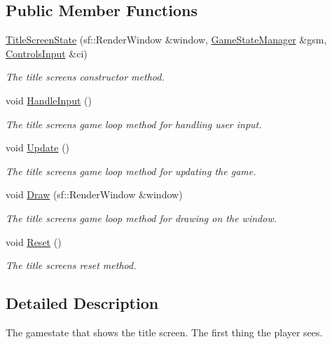 \subsection*{Public Member Functions}
\begin{DoxyCompactItemize}
\item 
\hyperlink{class_title_screen_state_ae0ab0c01ac47f036618a9d328d547ccd}{Title\+Screen\+State} (sf\+::\+Render\+Window \&window, \hyperlink{class_game_state_manager}{Game\+State\+Manager} \&gsm, \hyperlink{struct_controls_input}{Controls\+Input} \&ci)
\begin{DoxyCompactList}\small\item\em The title screen\textquotesingle{}s constructor method. \end{DoxyCompactList}\item 
void \hyperlink{class_title_screen_state_a1bad900daba7f6481632a58212f39af0}{Handle\+Input} ()
\begin{DoxyCompactList}\small\item\em The title screen\textquotesingle{}s game loop method for handling user input. \end{DoxyCompactList}\item 
void \hyperlink{class_title_screen_state_a0db8d35f9d3013155d2e61939d2a47ea}{Update} ()
\begin{DoxyCompactList}\small\item\em The title screen\textquotesingle{}s game loop method for updating the game. \end{DoxyCompactList}\item 
void \hyperlink{class_title_screen_state_a1e1022947dac4a9b69c6bde57fe52217}{Draw} (sf\+::\+Render\+Window \&window)
\begin{DoxyCompactList}\small\item\em The title screen\textquotesingle{}s game loop method for drawing on the window. \end{DoxyCompactList}\item 
void \hyperlink{class_title_screen_state_a7e6cf3ef5534f42a4ca1e75045a45c71}{Reset} ()
\begin{DoxyCompactList}\small\item\em The title screen\textquotesingle{}s reset method. \end{DoxyCompactList}\end{DoxyCompactItemize}


\subsection{Detailed Description}
The gamestate that shows the title screen. The first thing the player sees. 

